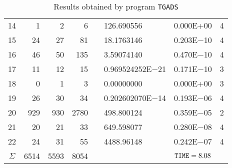 \documentclass{esub2acm}
\begin{document}
\begin{table}
\begin{tabular}{c|rrrr@{}lcc}
14  &   1   &   2   &   6   &       &   126.690556  &   0.000E+00   &   4   \\
15  &   24  &   27  &   81  &       &   18.1763146  &   0.203E$-$10 &   4   \\
16  &   46  &   50  &   135 &       &   3.59074140  &   0.470E$-$10 &   4   \\
17  &   11  &   12  &   15  &       &   0.969524252E$-$21   &   0.171E$-$10 &   3   \\
18  &   0   &   1   &   3   &       &   0.00000000  &   0.000E+00   &   3   \\
19  &   26  &   30  &   34  &       &   0.202602070E$-$14   &   0.193E$-$06 &   4   \\
20  &   929 &   930 &   2780    &       &   498.800124  &   0.359E$-$05 &   2   \\
21  &   20  &   21  &   33  &       &   649.598077  &   0.280E$-$08 &   4   \\
22  &   24  &   31  &   55  &       &   4488.96148  &   0.242E$-$07 &   4   \\ \hline
$\Sigma$\rule[-2pt]{0pt}{12pt}  &   6514    &   5593    &   8054    &       &       &   ${\tt TIME} = 8.08$ &       \\ \hline
\end{tabular}
\caption{Results obtained by program {\tt TGADS}}
\label{tgads}
\end{table}

\clearpage
\end{document}
